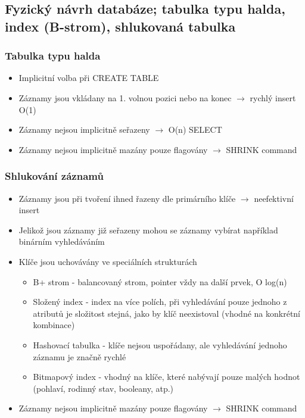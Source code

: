 \documentclass[10pt,a4paper]{article}
\begin{document}
\subsection{Fyzický návrh databáze; tabulka typu halda, index (B-strom), shlukovaná tabulka}
\subsubsection{Tabulka typu halda}
\begin{itemize}
\item Implicitní volba při CREATE TABLE
\item Záznamy jsou vkládany na 1. volnou pozici nebo na konec $\rightarrow$ rychlý insert O(1)
\item Záznamy nejsou implicitně seřazeny $\rightarrow$ O(n) SELECT
\item Záznamy nejsou implicitně mazány pouze flagovány $\rightarrow$ SHRINK command
\end{itemize}
\subsubsection{Shlukování záznamů}
\begin{itemize}
\item Záznamy jsou při tvoření ihned řazeny dle primárního klíče $\rightarrow$ neefektivní insert
\item Jelikož jsou záznamy již seřazeny mohou se záznamy vybírat například binárním vyhledáváním
\item Klíče jsou uchovávány ve speciálních strukturách
\begin{itemize}
\item B+ strom - balancovaný strom, pointer vždy na další prvek, O log(n)
\item Složený index - index na více polích, při vyhledávání pouze jednoho z atributů je složitost stejná, jako by klíč neexistoval (vhodné na konkrétní kombinace)
\item Hashovací tabulka - klíče nejsou uspořádany, ale vyhledávání jednoho záznamu je značně rychlé
\item Bitmapový index - vhodný na klíče, které nabývají pouze malých hodnot (pohlaví, rodinný stav, booleany, atp.)
\end{itemize}
\item Záznamy nejsou implicitně mazány pouze flagovány $\rightarrow$ SHRINK command
\end{itemize}
\end{document}
